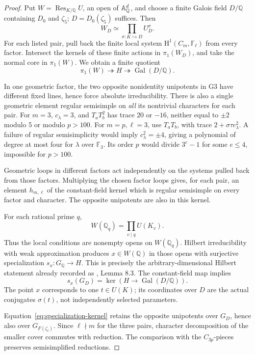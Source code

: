 \documentclass[11pt,a4paper]{article}
\theoremstyle{definition}\newtheorem{definition}[theorem]{Definition}
\theoremstyle{remark}\newtheorem*{remark}{Remark}
\newcommand{\Q}{\mathbb Q}\newcommand{\Z}{\mathbb Z}
\newcommand{\F}{\mathbb F}\newcommand{\OO}{\mathcal O}
\newcommand{\Gal}{\operatorname{Gal}}\newcommand{\Res}{\operatorname{Res}}
\newcommand{\srcM}{\cite{M}}
\begin{document}
\begin{proof}
Put \(W=\Res_{K/\Q}U\), an open of \(\A^d_\Q\), and choose a finite Galois
field \(D/\Q\) containing \(D_0\) and \(\zeta_5\); \(D=D_0(\zeta_5)\) suffices.
Then
\[
 W_D\simeq\prod_{\sigma:K\hookrightarrow D} U^\sigma_D.
\]
For each listed pair, pull back the finite local system
\(\mathrm H^1(C_m,\F_\ell)\) from every factor. Intersect the kernels of these
finite actions in \(\pi_1(W_D)\), and take the normal core in \(\pi_1(W)\).
We obtain a finite quotient
\[
 \pi_1(W)\twoheadrightarrow H\twoheadrightarrow\Gal(D/\Q).
\]

In one geometric factor, the two opposite nonidentity unipotents in G3 have
different fixed lines, hence force absolute irreducibility. There is also a
single geometric element regular semisimple on \emph{all} its nontrivial
characters for each pair. For \(m=3\), \(c_\lambda=3\), and \(T_aT_b^2\)
has trace \(20\) or \(-16\), neither equal to \(\pm2\) modulo 5 or modulo
\(p>100\). For \(m=p,\ell=3\), use \(T_aT_b\), with trace
\(2+\sigma\tau c_\lambda^2\). A failure of regular semisimplicity would imply
\(c_\lambda^2=\pm4\), giving a polynomial of degree at most four for
\(\lambda\) over \(\F_3\). Its order \(p\) would divide \(3^e-1\) for some
\(e\leq4\), impossible for \(p>100\).

Geometric loops in different factors act independently on the systems pulled
back from those factors. Multiplying the chosen factor loops gives, for each
pair, an element \(h_{m,\ell}\) of the constant-field kernel which is regular
semisimple on every factor and character. The opposite unipotents are also
in this kernel.

For each rational prime \(q\),
\[
 W(\Q_q)=\prod_{v\mid q}U(K_v).
\]
Thus the local conditions are nonempty opens on \(W(\Q_q)\). Hilbert
irreducibility with weak approximation produces \(x\in W(\Q)\) in those
opens with surjective specialization \(s_x:G_\Q\to H\). This is precisely
the arbitrary-dimensional Hilbert statement already recorded as \srcM,
Lemma 8.3. The constant-field map implies
\begin{equation}
 s_x(G_D)=\ker(H\to\Gal(D/\Q)).                 \label{eq:specialization-kernel}
\end{equation}
The point \(x\) corresponds to one \(t\in U(K)\); its coordinates over \(D\)
are the actual conjugates \(\sigma(t)\), not independently selected parameters.

Equation~\eqref{eq:specialization-kernel} retains the opposite unipotents over \(G_D\), hence also over
\(G_{F(\zeta_\ell)}\). Since \(\ell\nmid m\) for the three pairs, character
decomposition of the smaller cover commutes with reduction. The comparison
with the \(C_{3p}\)-pieces preserves semisimplified reductions.


\end{proof}
\end{document}
